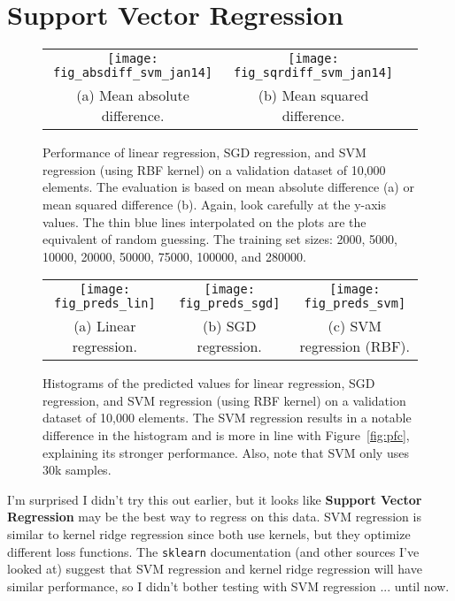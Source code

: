 \documentclass[a4paper, 11pt]{article}
\begin{document}
\section{Support Vector Regression}

\begin{figure}[t]
\begin{center}
\begin{tabular}{c@{}c@{}c}
\texttt{[image: fig\_absdiff\_svm\_jan14]} &
\texttt{[image: fig\_sqrdiff\_svm\_jan14]} \\
(a) Mean absolute difference. &
(b) Mean squared difference. \\
\end{tabular}
\end{center}
\caption{Performance of linear regression, SGD regression, and SVM regression (using RBF kernel) on
a validation dataset of 10,000 elements. The evaluation is based on mean absolute difference (a) or
mean squared difference (b). Again, look carefully at the y-axis values. The thin blue lines
interpolated on the plots are the equivalent of random guessing. The training set sizes: 2000, 5000,
10000, 20000, 50000, 75000, 100000, and 280000.}
\label{fig:svr_results}
\end{figure}

\begin{figure}[t]
\begin{center}
\begin{tabular}{c@{}c@{}c}
\texttt{[image: fig\_preds\_lin]} &
\texttt{[image: fig\_preds\_sgd]} &
\texttt{[image: fig\_preds\_svm]} \\
(a) Linear regression. &
(b) SGD regression. &
(c) SVM regression (RBF). \\
\end{tabular}
\end{center}
\caption{Histograms of the predicted values for linear regression, SGD regression, and SVM
regression (using RBF kernel) on a validation dataset of 10,000 elements. The SVM regression results
in a notable difference in the histogram and is more in line with Figure~\ref{fig:pfc}, explaining
its stronger performance. Also, note that SVM only uses 30k samples.}
\label{fig:svr_histograms}
\end{figure}

I'm surprised I didn't try this out earlier, but it looks like \textbf{Support Vector Regression}
may be the best way to regress on this data. SVM regression is similar to kernel ridge regression
since both use kernels, but they optimize different loss functions. The \texttt{sklearn}
documentation (and other sources I've looked at) suggest that SVM regression and kernel ridge
regression will have similar performance, so I didn't bother testing with SVM regression ... until
now.
\end{document}

